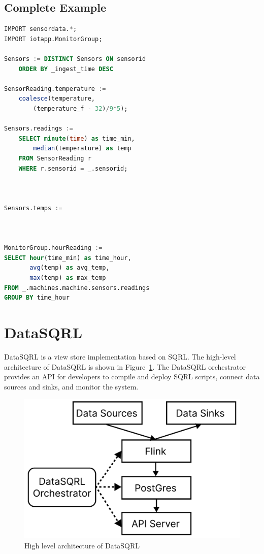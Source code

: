 \documentclass[	DIV=calc,%
							paper=letter,%
							fontsize=11pt,%
							twocolumn]{scrartcl}	 					%
\begin{document}
\subsection{Complete Example}

\begin{lstlisting}[language=SQL]
IMPORT sensordata.*;
IMPORT iotapp.MonitorGroup;

Sensors := DISTINCT Sensors ON sensorid
    ORDER BY _ingest_time DESC

SensorReading.temperature :=
    coalesce(temperature,
        (temperature_f - 32)/9*5);

Sensors.readings :=
    SELECT minute(time) as time_min,
        median(temperature) as temp
    FROM SensorReading r
    WHERE r.sensorid = _.sensorid;



Sensors.temps :=



MonitorGroup.hourReading :=
SELECT hour(time_min) as time_hour,
       avg(temp) as avg_temp,
       max(temp) as max_temp
FROM _.machines.machine.sensors.readings
GROUP BY time_hour
\end{lstlisting}


\section{DataSQRL}
\label{sec:datasqrl}

DataSQRL is a view store implementation based on SQRL. The high-level architecture of DataSQRL is shown in Figure~\ref{fig:datasqrl_architecture}. The DataSQRL orchestrator provides an API for developers to compile and deploy SQRL scripts, connect data sources and sinks, and monitor the system.

\begin{figure}[h]
\includegraphics[width=\linewidth]{datasqrl_architecture.pdf}
\caption{High level architecture of DataSQRL}
\label{fig:datasqrl_architecture}
\end{figure}
\end{document}
